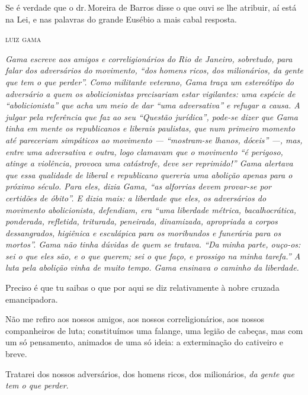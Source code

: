Se é verdade que o dr.\,Moreira de Barros disse o que ouvi se lhe
atribuir, aí está na Lei, e nas palavras do grande Eusébio a mais cabal
resposta.

\medskip

\hfill\textsc{luiz gama}




\begin{resumo}
\emph{Gama escreve aos amigos e correligionários do Rio de Janeiro,
sobretudo, para falar dos adversários do movimento, ``dos homens ricos,
dos milionários, da gente que tem o que perder''. Como militante
veterano, Gama traça um estereótipo do adversário a quem os
abolicionistas precisariam estar vigilantes: uma espécie de
``abolicionista'' que acha um meio de dar ``uma adversativa'' e refugar a
causa. A julgar pela referência que faz ao seu ``Questão
jurídica'', pode-se dizer que Gama tinha em mente os republicanos e
liberais paulistas, que num primeiro momento até pareceriam simpáticos
ao movimento --- ``mostram-se lhanos, dóceis'' ---, mas, entre uma
adversativa e outra, logo clamavam que o movimento ``é perigoso, atinge a
violência, provoca uma catástrofe, deve ser reprimido!'' Gama alertava
que essa qualidade de liberal e republicano quereria uma abolição
apenas para o próximo século. Para eles, dizia Gama, ``as alforrias devem
provar-se por certidões de óbito''. E dizia mais: a liberdade que eles,
os adversários do movimento abolicionista, defendiam, era ``uma liberdade
métrica, bacalhocrática, ponderada, refletida, triturada, peneirada,
dinamizada, apropriada a corpos dessangrados, higiênica e esculápica
para os moribundos e funerária para os mortos''. Gama não tinha dúvidas
de quem se tratava. ``Da minha parte, ouço-os: sei o que eles são, e o
que querem; sei o que faço, e prossigo na minha tarefa.'' A luta pela
abolição vinha de muito tempo. Gama ensinava o caminho da liberdade. }
\end{resumo}

Preciso é que tu saibas o que por aqui se diz relativamente à nobre
cruzada emancipadora.

Não me refiro aos nossos amigos, aos nossos correligionários, aos nossos
companheiros de luta; constituímos uma falange, uma legião de cabeças,
mas com um só pensamento, animados de uma só ideia: a exterminação do
cativeiro e breve.

Tratarei dos nossos adversários, dos homens ricos, dos milionários,
\emph{da gente que tem o que perder}.

